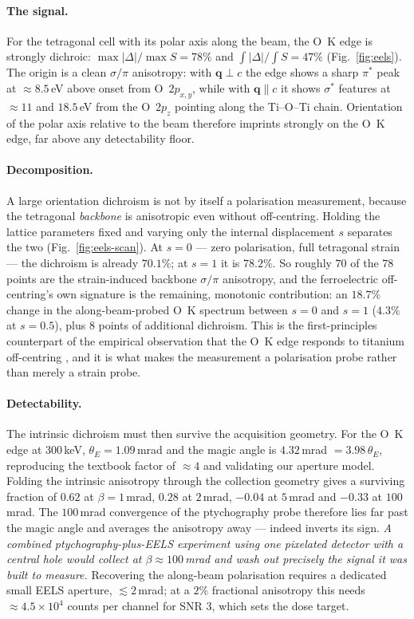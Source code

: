 \documentclass[aps,prb,twocolumn,superscriptaddress,floatfix,nofootinbib]{revtex4-2}
\begin{document}
\paragraph{The signal.} For the tetragonal cell with its polar axis along the beam, the O~K edge
is strongly dichroic: $\max|\Delta|/\max S = 78\%$ and $\int|\Delta|/\int S=47\%$
(Fig.~\ref{fig:eels}). The origin is a clean $\sigma/\pi$ anisotropy: with
$\mathbf{q}\perp c$ the edge shows a sharp $\pi^*$ peak at $\approx8.5$\,eV above onset from
O~$2p_{x,y}$, while with $\mathbf{q}\parallel c$ it shows $\sigma^*$ features at
$\approx11$ and $18.5$\,eV from the O~$2p_z$ pointing along the Ti--O--Ti chain. Orientation of
the polar axis relative to the beam therefore imprints strongly on the O~K edge, far above any
detectability floor.

\paragraph{Decomposition.} A large orientation dichroism is not by itself a polarisation
measurement, because the tetragonal \emph{backbone} is anisotropic even without off-centring.
Holding the lattice parameters fixed and varying only the internal displacement $s$ separates
the two (Fig.~\ref{fig:eels-scan}). At $s=0$ --- zero polarisation, full tetragonal strain ---
the dichroism is already $70.1\%$; at $s=1$ it is $78.2\%$. So roughly $70$ of the $78$ points
are the strain-induced backbone $\sigma/\pi$ anisotropy, and the ferroelectric off-centring's
own signature is the remaining, monotonic contribution: an $18.7\%$ change in the
along-beam-probed O~K spectrum between $s=0$ and $s=1$ ($4.3\%$ at $s=0.5$), plus $8$ points of
additional dichroism. This is the first-principles counterpart of the empirical observation that
the O~K edge responds to titanium off-centring \citep{Bugnet2016}, and it is what makes the
measurement a polarisation probe rather than merely a strain probe.

\paragraph{Detectability.} The intrinsic dichroism must then survive the acquisition geometry.
For the O~K edge at $300$\,keV, $\theta_E=1.09$\,mrad and the magic angle is $4.32$\,mrad
$=3.98\,\theta_E$, reproducing the textbook factor of $\approx4$ and validating our aperture
model. Folding the intrinsic anisotropy through the collection geometry gives a surviving
fraction of $0.62$ at $\beta=1$\,mrad, $0.28$ at $2$\,mrad, $-0.04$ at $5$\,mrad and
$-0.33$ at $100$\,mrad. The $100$\,mrad convergence of the ptychography probe therefore lies far
past the magic angle and averages the anisotropy away --- indeed inverts its sign. \emph{A
combined ptychography-plus-EELS experiment using one pixelated detector with a central hole
would collect at $\beta\approx100$\,mrad and wash out precisely the signal it was built to
measure.} Recovering the along-beam polarisation requires a dedicated small EELS aperture,
$\lesssim2$\,mrad; at a $2\%$ fractional anisotropy this needs $\approx4.5\times10^{4}$
counts per channel for SNR $3$, which sets the dose target.
\end{document}
